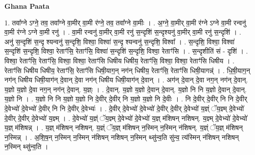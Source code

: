 \documentclass[17pt]{extarticle}
\begin{document}
\textbf{Ghana Paata } \newline

1. तवा᳚ग्ने ऽग्ने॒ तव॒ तवा᳚ग्ने वा॒मीर् वा॒मी र॑ग्ने॒ तव॒ तवा᳚ग्ने वा॒मीः । . अ॒ग्ने॒ वा॒मीर् वा॒मी र॑ग्ने ऽग्ने वा॒मी रन्वनु॑ वा॒मी र॑ग्ने ऽग्ने वा॒मी रनु॑ । . वा॒मी रन्वनु॑ वा॒मीर् वा॒मी रनु॑ स॒न्दृशि॑ स॒न्दृश्यनु॑ वा॒मीर् वा॒मी रनु॑ स॒न्दृशि॑ । . अनु॑ स॒न्दृशि॑ स॒न्दृ श्यन्वनु॑ स॒न्दृशि॒ विश्वा॒ विश्वा॑ स॒न्दृ श्यन्वनु॑ स॒न्दृशि॒ विश्वा᳚ । . स॒न्दृशि॒ विश्वा॒ विश्वा॑ स॒न्दृशि॑ स॒न्दृशि॒ विश्वा॒ रेताꣳ॑सि॒ रेताꣳ॑सि॒ विश्वा॑ स॒न्दृशि॑ स॒न्दृशि॒ विश्वा॒ रेताꣳ॑सि । . स॒न्दृशीति॑ सं - दृशि॑ । . विश्वा॒ रेताꣳ॑सि॒ रेताꣳ॑सि॒ विश्वा॒ विश्वा॒ रेताꣳ॑सि धिषीय धिषीय॒ रेताꣳ॑सि॒ विश्वा॒ विश्वा॒ रेताꣳ॑सि धिषीय । . रेताꣳ॑सि धिषीय धिषीय॒ रेताꣳ॑सि॒ रेताꣳ॑सि धिषी॒याग॒न् नग॑न् धिषीय॒ रेताꣳ॑सि॒ रेताꣳ॑सि धिषी॒यागन्न्॑ । . धि॒षी॒याग॒न् नग॑न् धिषीय धिषी॒याग॑न् दे॒वान् दे॒वा नग॑न् धिषीय धिषी॒याग॑न् दे॒वान् । . अग॑न् दे॒वान् दे॒वा नग॒न् नग॑न् दे॒वान्. य॒ज्ञो य॒ज्ञो दे॒वा नग॒न् नग॑न् दे॒वान्. य॒ज्ञ्ः । . दे॒वान्. य॒ज्ञो य॒ज्ञो दे॒वान् दे॒वान्. य॒ज्ञो नि नि य॒ज्ञो दे॒वान् दे॒वान्. य॒ज्ञो नि । . य॒ज्ञो नि नि य॒ज्ञो य॒ज्ञो नि दे॒वीर् दे॒वीर् नि य॒ज्ञो य॒ज्ञो नि दे॒वीः । . नि दे॒वीर् दे॒वीर् नि नि दे॒वीर् दे॒वेभ्यो॑ दे॒वेभ्यो॑ दे॒वीर् नि नि दे॒वीर् दे॒वेभ्यः॑ । . दे॒वीर् दे॒वेभ्यो॑ दे॒वेभ्यो॑ दे॒वीर् दे॒वीर् दे॒वेभ्यो॑ य॒ज्ञ्ं ॅय॒ज्ञ्म् दे॒वेभ्यो॑ दे॒वीर् दे॒वीर् दे॒वेभ्यो॑ य॒ज्ञ्म् । . दे॒वेभ्यो॑ य॒ज्ञ्ं ॅय॒ज्ञ्म् दे॒वेभ्यो॑ दे॒वेभ्यो॑ य॒ज्ञ् म॑शिषन् नशिषन्. य॒ज्ञ्म् दे॒वेभ्यो॑ दे॒वेभ्यो॑ य॒ज्ञ् म॑शिषन्न् । . य॒ज्ञ् म॑शिषन् नशिषन्. य॒ज्ञ्ं ॅय॒ज्ञ् म॑शिषन् न॒स्मिन् न॒स्मिन् न॑शिषन्. य॒ज्ञ्ं ॅय॒ज्ञ् म॑शिषन् न॒स्मिन्न् । . अ॒शि॒ष॒न् न॒स्मिन् न॒स्मिन् न॑शिषन् नशिषन् न॒स्मिन् थ्सु॑न्व॒ति सु॑न्व॒ त्य॑स्मिन् न॑शिषन् नशिषन् न॒स्मिन् थ्सु॑न्व॒ति । \newline
\end{document}
